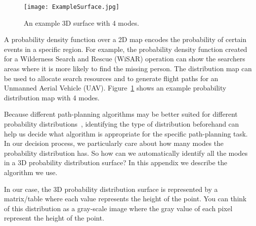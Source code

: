 \begin{figure}
\centering
\texttt{[image: ExampleSurface.jpg]}
\caption{An example 3D surface with 4 modes.}
\label{4modes}
\end{figure}



A probability density function over a 2D map encodes the probability of certain events in a specific region. For example, the probability density function created for a Wilderness Search and Rescue (WiSAR) operation can show the searchers areas where it is more likely to find the missing person. The distribution map can be used to allocate search resources and to generate flight paths for an Unmanned Aerial Vehicle (UAV). Figure~\ref{4modes} shows an example probability distribution map with 4 modes.

Because different path-planning algorithms may be better suited for different probability distributions~\cite{Wolpert1997No}, identifying the type of distribution beforehand can help us decide what algorithm is appropriate for the specific path-planning task. In our decision process, we particularly care about how many modes the probability distribution has. So how can we automatically identify all the modes in a 3D probability distribution surface? In this appendix we describe the algorithm we use.

In our case, the 3D probability distribution surface is represented by a matrix/table where each value represents the height of the point. You can think of this distribution as a gray-scale image where the gray value of each pixel represent the height of the point.


